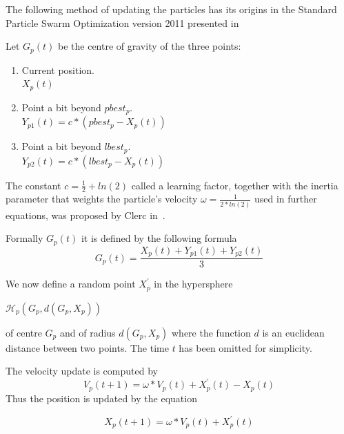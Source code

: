 \documentclass{article}
\begin{document}
The following method of updating the particles has its origins in the Standard Particle Swarm Optimization version 2011 presented in~\cite{pso_11}

Let $G_p(t)$ be the centre of gravity of the three points:
\begin{enumerate}
	\item Current position. \\
	$X_p(t)$
	
	\item Point a bit beyond $pbest_p$. \\
	$Y_{p1}(t) = c*(pbest_p-X_p(t))$
	
	\item Point a bit beyond $lbest_p$. \\
	$Y_{p2}(t) = c*(lbest_p-X_p(t))$
			
\end{enumerate}

The constant $c = \frac{1}{2} + ln(2)$ called a learning factor, together with the inertia parameter that weights the particle's velocity $\omega = \frac{1}{2 * ln(2)}$ used in further equations, was proposed by Clerc in~\cite{pso_anal}.

Formally $G_p(t)$ it is defined by the following formula 
\begin{equation}
	G_p(t) = \frac{X_p(t) + Y_{p1}(t) + Y_{p2}(t)} {3}
\end{equation}

We now define a random point $X^{'}_p$ in the hypersphere
\begin{center}
	$\mathcal{H}_p(G_p, d(G_p, X_p))$ 
\end{center}
of centre $G_p$ and of radius $d(G_p, X_p)$ where the function $d$ is an euclidean distance between two points. The time $t$ has been omitted for simplicity.

The velocity update is computed by
\begin{equation}
	V_p(t+1) = \omega * V_p(t) + X^{'}_p(t) - X_p(t)
\end{equation}
Thus the position is updated by the equation

\begin{equation}
	X_p(t+1) = \omega * V_p(t) + X^{'}_p(t)
\end{equation}


\end{document}
